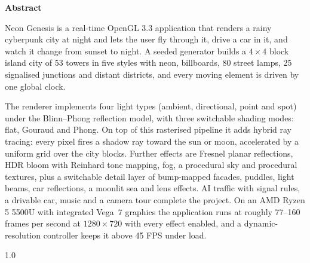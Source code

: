 \documentclass[12pt, a4paper]{report}
\newcommand{\blanklines}[1]{\vspace{#1\dimexpr 18pt\relax}}
\begin{document}
\newpage
{}
\setcounter{page}{1}
\thispagestyle{plain}

\begin{center}
  {\fontsize{16}{24}\bfseries Abstract}
\end{center}

\blanklines{1}

\begin{justify}
  {\fontsize{12}{13.8}\selectfont
    Neon Genesis is a real-time OpenGL 3.3 application that renders a rainy cyberpunk city at night and lets the user fly through it, drive a car in it, and watch it change from sunset to night. A seeded generator builds a $4\times4$ block island city of 53 towers in five styles with neon, billboards, 80 street lamps, 25 signalised junctions and distant districts, and every moving element is driven by one global clock.

    The renderer implements four light types (ambient, directional, point and spot) under the Blinn--Phong reflection model, with three switchable shading modes: flat, Gouraud and Phong. On top of this rasterised pipeline it adds hybrid ray tracing: every pixel fires a shadow ray toward the sun or moon, accelerated by a uniform grid over the city blocks. Further effects are Fresnel planar reflections, HDR bloom with Reinhard tone mapping, fog, a procedural sky and procedural textures, plus a switchable detail layer of bump-mapped facades, puddles, light beams, car reflections, a moonlit sea and lens effects. AI traffic with signal rules, a drivable car, music and a camera tour complete the project. On an AMD Ryzen 5 5500U with integrated Vega~7 graphics the application runs at roughly 77--160 frames per second at $1280\times720$ with every effect enabled, and a dynamic-resolution controller keeps it above 45 FPS under load.
  }
\end{justify}

\newpage
\thispagestyle{plain}
\setcounter{tocdepth}{1}
\begin{spacing}{1.0}
\tableofcontents
\end{spacing}

\clearpage
{}
\setcounter{page}{1}
\end{document}
